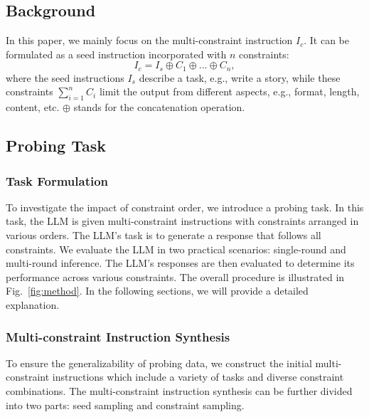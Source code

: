 \subsection{Background}
In this paper, we mainly focus on the multi-constraint instruction $I_c$. It can be formulated as a seed instruction incorporated with ${n}$ constraints:
\begin{equation}
\label{eq1}
    I_c = I_s \oplus C_1 \oplus ... \oplus C_n,
\end{equation}
where the seed instructions $I_s$ describe a task, e.g., write a story, while these constraints $\sum_{i=1}^n C_i$ limit the output from different aspects, e.g., format, length, content, etc. $\oplus$ stands for the concatenation operation. 


\subsection{Probing Task} \label{method}
\subsubsection{Task Formulation}
To investigate the impact of constraint order, we introduce a probing task. In this task, the LLM is given multi-constraint instructions with constraints arranged in various orders. The LLM's task is to generate a response that follows all constraints. We evaluate the LLM in two practical scenarios: single-round and multi-round inference. The LLM's responses are then evaluated to determine its performance across various constraints. The overall procedure is illustrated in Fig.~\ref{fig:method}. In the following sections, we will provide a detailed explanation.





\subsubsection{Multi-constraint Instruction Synthesis}\label{sec:ins_cons}
To ensure the generalizability of probing data, we construct the initial multi-constraint instructions which include a variety of tasks and diverse constraint combinations. The multi-constraint instruction synthesis can be further divided into two parts: seed sampling and constraint sampling. 

